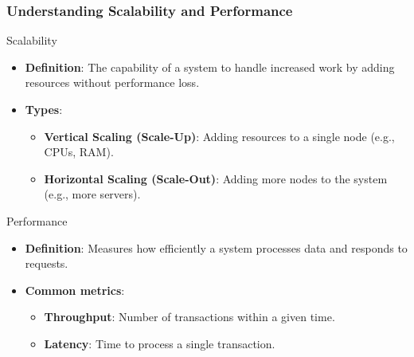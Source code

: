 \documentclass[aspectratio=169]{beamer}
\begin{document}
\begin{frame}[fragile]
    \frametitle{Understanding Scalability and Performance}
    \begin{block}{Scalability}
        \begin{itemize}
            \item \textbf{Definition}: The capability of a system to handle increased work by adding resources without performance loss.
            \item \textbf{Types}:
                \begin{itemize}
                    \item \textbf{Vertical Scaling (Scale-Up)}: Adding resources to a single node (e.g., CPUs, RAM).
                    \item \textbf{Horizontal Scaling (Scale-Out)}: Adding more nodes to the system (e.g., more servers).
                \end{itemize}
        \end{itemize}
    \end{block}
    
    \begin{block}{Performance}
        \begin{itemize}
            \item \textbf{Definition}: Measures how efficiently a system processes data and responds to requests.
            \item \textbf{Common metrics}:
                \begin{itemize}
                    \item \textbf{Throughput}: Number of transactions within a given time.
                    \item \textbf{Latency}: Time to process a single transaction.
                \end{itemize}
        \end{itemize}
    \end{block}
\end{frame}
\end{document}
